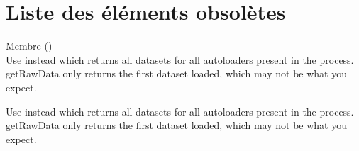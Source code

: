 \chapter{Liste des éléments obsolètes}
\hypertarget{deprecated}{}\label{deprecated}

\begin{DoxyRefList}
\item[Membre \doxylink{class_composer_1_1_installed_versions_a1fd2f2e9169766a9a1e937bdaf4b0368}{Composer\textbackslash{}Installed\+Versions\+::get\+Raw\+Data} ()]\hfill \\
\label{deprecated__deprecated000001}%
%
Use  instead which returns all datasets for all autoloaders present in the process. get\+Raw\+Data only returns the first dataset loaded, which may not be what you expect. 

\label{deprecated__deprecated000002}%
%
Use  instead which returns all datasets for all autoloaders present in the process. get\+Raw\+Data only returns the first dataset loaded, which may not be what you expect. 
\end{DoxyRefList}